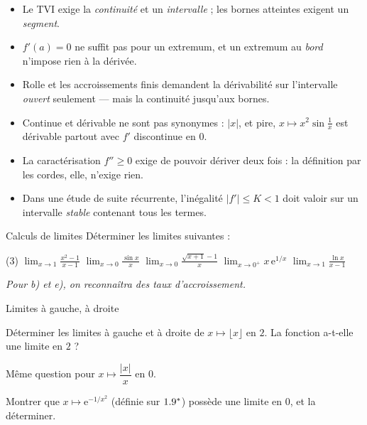 \begin{attention}
\begin{itemize}[label={\color{otOrange}\textbullet},leftmargin=1.4em,itemsep=0.6mm,topsep=0.5mm]
  \item Le TVI exige la \emph{continuité} et un \emph{intervalle} ; les
    bornes atteintes exigent un \emph{segment}.
  \item $f'(a)=0$ ne suffit pas pour un extremum, et un extremum au
    \emph{bord} n'impose rien à la dérivée.
  \item Rolle et les accroissements finis demandent la dérivabilité sur
    l'intervalle \emph{ouvert} seulement — mais la continuité jusqu'aux bornes.
  \item Continue et dérivable ne sont pas synonymes : $|x|$, et pire,
    $x\mapsto x^{2}\sin\frac1x$ est dérivable partout avec $f'$ discontinue
    en $0$.
  \item La caractérisation $f''\geq0$ exige de pouvoir dériver deux fois :
    la définition par les cordes, elle, n'exige rien.
  \item Dans une étude de suite récurrente, l'inégalité $|f'|\leq K<1$ doit
    valoir sur un intervalle \emph{stable} contenant tous les termes.
\end{itemize}
\end{attention}

\exercices
{}

\begin{exercice}[1]{Calculs de limites}
Déterminer les limites suivantes :
\begin{tasks}(3)
  \task $\displaystyle\lim_{x\to1}\frac{x^{2}-1}{x-1}$
  \task $\displaystyle\lim_{x\to0}\frac{\sin x}{x}$
  \task $\displaystyle\lim_{x\to0}\frac{\sqrt{x+1}-1}{x}$
  \task $\displaystyle\lim_{x\to0^{+}}x\,\mathrm{e}^{1/x}$
  \task $\displaystyle\lim_{x\to1}\frac{\ln x}{x-1}$
\end{tasks}
\emph{Pour b) et e), on reconnaîtra des taux d'accroissement.}
\end{exercice}

\begin{exercice}[1]{Limites à gauche, à droite}
\begin{questions}
  \item Déterminer les limites à gauche et à droite de
    $x\mapsto\lfloor x\rfloor$ en $2$. La fonction a-t-elle une limite en
    $2$ ?
  \item Même question pour $x\mapsto\dfrac{|x|}{x}$ en $0$.
  \item Montrer que $x\mapsto\mathrm{e}^{-1/x^{2}}$ (définie sur $1.9^{*}$)
    possède une limite en $0$, et la déterminer.
\end{questions}
\end{exercice}

